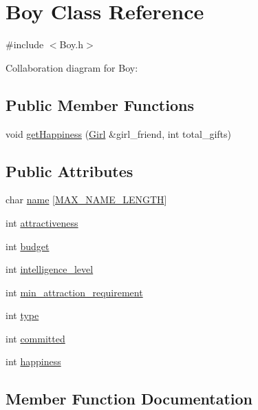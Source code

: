 \hypertarget{class_boy}{}\section{Boy Class Reference}
\label{class_boy}


{\ttfamily \#include $<$Boy.\+h$>$}



Collaboration diagram for Boy\+:
\subsection*{Public Member Functions}
\begin{DoxyCompactItemize}
\item 
void \hyperlink{class_boy_a45d40d86f500ac876afd0af425a6acf5}{get\+Happiness} (\hyperlink{class_girl}{Girl} \&girl\+\_\+friend, int total\+\_\+gifts)
\end{DoxyCompactItemize}
\subsection*{Public Attributes}
\begin{DoxyCompactItemize}
\item 
char \hyperlink{class_boy_a3ceaefba33434bcf8ec3c88fc4622af8}{name} \mbox{[}\hyperlink{_girl_8h_a0c397a708cec89c74029582574516b30}{M\+A\+X\+\_\+\+N\+A\+M\+E\+\_\+\+L\+E\+N\+G\+TH}\mbox{]}
\item 
int \hyperlink{class_boy_a679e59279116986aaae135d8a524bc46}{attractiveness}
\item 
int \hyperlink{class_boy_a3b755250e77f892967872c7eb4c26685}{budget}
\item 
int \hyperlink{class_boy_a2974e9a9600a7d88256b159b868b80c0}{intelligence\+\_\+level}
\item 
int \hyperlink{class_boy_a3b85e00dc9b5e1b67a6954a1230656c4}{min\+\_\+attraction\+\_\+requirement}
\item 
int \hyperlink{class_boy_a1b907f52b73e8355ce0dd02db65afa4f}{type}
\item 
int \hyperlink{class_boy_ab92b452f9cf9d97fc0c0f8aa6139da46}{committed}
\item 
int \hyperlink{class_boy_adaf15f15972678dbd77e8b8b319d5767}{happiness}
\end{DoxyCompactItemize}


\subsection{Member Function Documentation}
\mbox{\label{class_boy_a45d40d86f500ac876afd0af425a6acf5}} 
